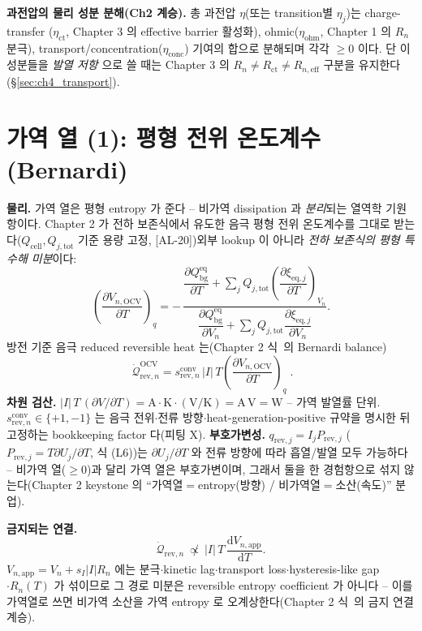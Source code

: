 \documentclass[11pt,a4paper]{article}
\newcommand{\dd}{\mathrm{d}}
\newcommand{\eff}{\mathrm{eff}}
\newcommand{\eq}{\mathrm{eq}}
\newcommand{\app}{\mathrm{app}}
\newcommand{\bg}{\mathrm{bg}}
\newcommand{\cell}{\mathrm{cell}}
\newcommand{\OCV}{\mathrm{OCV}}
\newcommand{\tot}{\mathrm{tot}}
\newcommand{\rev}{\mathrm{rev}}
\newcommand{\ct}{\mathrm{ct}}
\newcommand{\ohm}{\mathrm{ohm}}
\newcommand{\conc}{\mathrm{conc}}
\newcommand{\conv}{\mathrm{conv}}
\newcommand{\AL}[1]{\textsf{[AL-#1]}}
\begin{document}
\textbf{과전압의 물리 성분 분해(Ch2 계승).} 총 과전압 $\eta$(또는 transition별 $\eta_j$)는 charge-transfer
($\eta_\ct$, Chapter 3 의 effective barrier 활성화), ohmic($\eta_\ohm$, Chapter 1 의 $R_n$ 분극),
transport/concentration($\eta_\conc$) 기여의 합으로 분해되며 각각 $\ge0$ 이다. 단 이 성분들을 \emph{발열 저항}
으로 쓸 때는 Chapter 3 의 $R_n\ne R_\ct\ne R_{n,\eff}$ 구분을 유지한다(\S\ref{sec:ch4_transport}).

\section{가역 열 (1): 평형 전위 온도계수 (Bernardi)}\label{sec:ch4_revOCV}
\textbf{물리.} 가역 열은 평형 entropy 가 준다 -- 비가역 dissipation 과 \emph{분리}되는 열역학 기원 항이다.
Chapter 2 가 전하 보존식에서 유도한 음극 평형 전위 온도계수를 그대로 받는다($Q_\cell,Q_{j,\tot}$ 기준 용량
고정, \AL{20})\textemdash 외부 lookup 이 아니라 \emph{전하 보존식의 평형 특수해 미분}이다:
\begin{equation}
\left(\frac{\partial V_{n,\OCV}}{\partial T}\right)_q
=-\,\frac{\dfrac{\partial Q_\bg^{\eq}}{\partial T}+\displaystyle\sum_j Q_{j,\tot}\left(\dfrac{\partial\xi_{\eq,j}}{\partial T}\right)_{V_n}}
{\dfrac{\partial Q_\bg^{\eq}}{\partial V_n}+\displaystyle\sum_j Q_{j,\tot}\dfrac{\partial\xi_{\eq,j}}{\partial V_n}}.
\label{eq:ch4_ocv_dvdt}
\end{equation}
방전 기준 음극 reduced reversible heat 는(Chapter 2 식~의 Bernardi balance)
\begin{equation}
\boxed{\;\dot{\mathcal Q}_{\rev,n}^{\OCV}=s_{\rev,n}^{\conv}\,|I|\,T\left(\frac{\partial V_{n,\OCV}}{\partial T}\right)_q\;.}
\label{eq:ch4_rev_ocv}
\end{equation}
\textbf{차원 검산.} $|I|\,T\,(\partial V/\partial T)=\mathrm A\cdot\mathrm K\cdot(\mathrm{V/K})=\mathrm{A\,V}=\mathrm W$
-- 가역 발열률 단위. $s_{\rev,n}^{\conv}\in\{+1,-1\}$ 는 음극 전위$\cdot$전류 방향$\cdot$heat-generation-positive
규약을 명시한 뒤 고정하는 bookkeeping factor 다(피팅 X).
\textbf{부호가변성.} $q_{\rev,j}=I_jP_{\rev,j}$ ($P_{\rev,j}=T\partial U_j/\partial T$, 식 (L6))는 $\partial U_j/\partial T$
와 전류 방향에 따라 흡열/발열 모두 가능하다 -- 비가역 열($\ge0$)과 달리 가역 열은 부호가변이며, 그래서 둘을 한
경험항으로 섞지 않는다(Chapter 2 keystone 의 ``가역열$=$entropy(방향) / 비가역열$=$소산(속도)'' 분업).

\textbf{금지되는 연결.}
\begin{equation}
\dot{\mathcal Q}_{\rev,n}\ \not\propto\ |I|\,T\,\frac{\dd V_{n,\app}}{\dd T}.
\label{eq:ch4_forbid}
\end{equation}
$V_{n,\app}=V_n+s_I|I|R_n$ 에는 분극$\cdot$kinetic lag$\cdot$transport loss$\cdot$hysteresis-like gap$\cdot R_n(T)$
가 섞이므로 그 경로 미분은 reversible entropy coefficient 가 아니다 -- 이를 가역열로 쓰면 비가역 소산을 가역
entropy 로 오계상한다(Chapter 2 식~의 금지 연결 계승).
\end{document}
